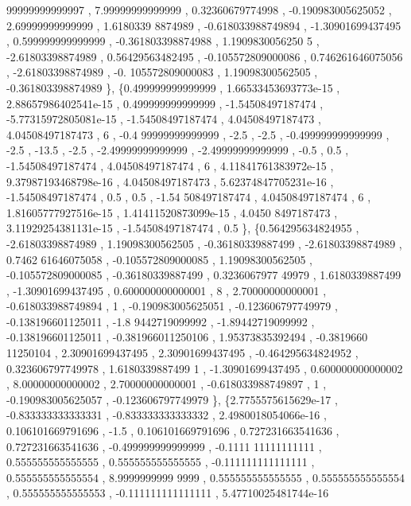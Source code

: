 \begin{DoxyCode}
      99999999999997 ,  7.99999999999999 ,  0.32360679774998 , -0.190983005625052 ,  2.69999999999999 ,  1.6180339
      8874989 , -0.618033988749894 , -1.30901699437495 , 0.599999999999999 , -0.361803398874988 ,  1.1909830056250
      5 , -2.61803398874989 ,  0.56429563482495 , -0.105572809000086 , 0.746261646075056 , -2.61803398874989 , -0.
      105572809000083 ,  1.19098300562505 , -0.361803398874989 \},
\{0.499999999999999 , 1.66533453693773e-15 , 2.88657986402541e-15 , 0.499999999999999 , -1.54508497187474 , 
      -5.77315972805081e-15 , -1.54508497187474 ,  4.04508497187473 ,  4.04508497187473 ,                 6 , -0.4
      99999999999999 ,              -2.5 ,              -2.5 , -0.499999999999999 ,              -2.5 ,           
        -13.5 ,              -2.5 , -2.49999999999999 , -2.49999999999999 ,              -0.5 ,               0.5 
      , -1.54508497187474 ,  4.04508497187474 ,                 6 , 4.11841761383972e-15 , 9.37987193468798e-16 , 
       4.04508497187473 , 5.62374847705231e-16 , -1.54508497187474 ,               0.5 ,               0.5 , -1.54
      508497187474 ,  4.04508497187474 ,                 6 , 1.81605777927516e-15 , 1.41411520873099e-15 ,  4.0450
      8497187473 , 3.11929254381131e-15 , -1.54508497187474 ,               0.5 \},
\{0.564295634824955 , -2.61803398874989 ,  1.19098300562505 , -0.36180339887499 , -2.61803398874989 , 0.7462
      61646075058 , -0.105572809000085 ,  1.19098300562505 , -0.105572809000085 , -0.36180339887499 , 0.3236067977
      49979 ,   1.6180339887499 , -1.30901699437495 , 0.600000000000001 ,                 8 ,  2.70000000000001 , 
      -0.618033988749894 ,                 1 , -0.190983005625051 , -0.123606797749979 , -0.138196601125011 , -1.8
      9442719099992 , -1.89442719099992 , -0.138196601125011 , -0.381966011250106 ,  1.95373835392494 , -0.3819660
      11250104 ,  2.30901699437495 ,  2.30901699437495 , -0.464295634824952 , 0.323606797749978 ,  1.6180339887499
      1 , -1.30901699437495 , 0.600000000000002 ,  8.00000000000002 ,  2.70000000000001 , -0.618033988749897 ,    
                   1 , -0.190983005625057 , -0.123606797749979 \},
\{2.7755575615629e-17 , -0.833333333333331 , -0.833333333333332 , 2.4980018054066e-16 , 0.106101669791696 , 
                   -1.5 , 0.106101669791696 , 0.727231663541636 , 0.727231663541636 , -0.499999999999999 , -0.1111
      11111111111 , 0.555555555555555 , 0.555555555555555 , -0.111111111111111 , 0.555555555555554 ,  8.9999999999
      9999 , 0.555555555555555 , 0.555555555555554 , 0.555555555555553 , -0.111111111111111 , 5.47710025481744e-16

\end{DoxyCode}
